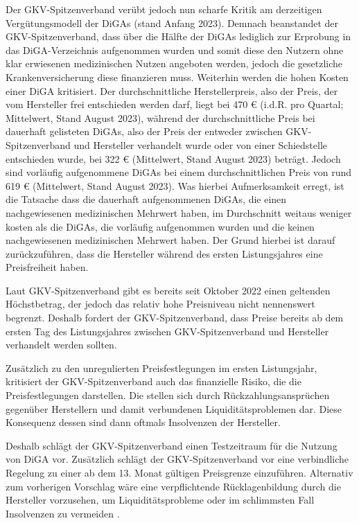 \documentclass{article}
\begin{document}
			Der GKV-Spitzenverband verübt jedoch nun scharfe Kritik am derzeitigen Vergütungsmodell der DiGAs (stand Anfang 2023). Demnach beanstandet der GKV-Spitzenverband, dass über die Hälfte der DiGAs lediglich zur Erprobung in das DiGA-Verzeichnis aufgenommen wurden und somit diese den Nutzern ohne klar erwiesenen medizinischen Nutzen angeboten werden, jedoch die gesetzliche Krankenversicherung diese finanzieren muss. Weiterhin werden die hohen Kosten einer DiGA kritisiert. Der durchschnittliche Herstellerpreis, also der Preis, der vom Hersteller frei entschieden werden darf, liegt bei 470 € (i.d.R. pro Quartal; Mittelwert, Stand August 2023), während der durchschnittliche Preis bei dauerhaft gelisteten DiGAs, also der Preis der entweder zwischen GKV-Spitzenverband und Hersteller verhandelt wurde oder von einer Schiedstelle entschieden wurde, bei 322 € (Mittelwert, Stand August 2023) beträgt. Jedoch sind vorläufig aufgenommene DiGAs bei einem durchschnittlichen Preis von rund 619 € (Mittelwert, Stand August 2023). Was hierbei Aufmerksamkeit erregt, ist die Tatsache dass die dauerhaft aufgenommenen DiGAs, die einen nachgewiesenen medizinischen Mehrwert haben, im Durchschnitt weitaus weniger kosten als die DiGAs, die vorläufig aufgenommen wurden und die keinen nachgewiesenen medizinischen Mehrwert haben. Der Grund hierbei ist darauf zurückzuführen, dass die Hersteller während des ersten Listungsjahres eine Preisfreiheit haben.\par    
			Laut GKV-Spitzenverband gibt es bereits seit Oktober 2022 einen geltenden Höchstbetrag, der jedoch das relativ hohe Preisniveau nicht nennenswert begrenzt. Deshalb fordert der GKV-Spitzenverband, dass Preise bereits ab dem ersten Tag des Listungsjahres zwischen GKV-Spitzenverband und Hersteller verhandelt werden sollten.\par 
			Zusätzlich zu den unregulierten Preisfestlegungen im ersten Listungsjahr, kritisiert der GKV-Spitzenverband auch das finanzielle Risiko, die die Preisfestlegungen darstellen. Die stellen sich durch Rückzahlungsansprüchen gegenüber Herstellern und damit verbundenen Liquiditätsproblemen dar. Diese Konsequenz dessen sind dann oftmals Insolvenzen der Hersteller.\par 
			Deshalb schlägt der GKV-Spitzenverband einen Testzeitraum für die Nutzung von DiGA vor. Zusätzlich schlägt der GKV-Spitzenverband vor eine verbindliche Regelung zu einer ab dem 13. Monat gültigen Preisgrenze einzuführen. Alternativ zum vorherigen Vorschlag wäre eine verpflichtende Rücklagenbildung durch die Hersteller vorzusehen, um Liquiditätsprobleme oder im schlimmsten Fall Insolvenzen zu vermeiden \cite{frauenhofinstitut}.    	
			\newpage	     
\end{document}
